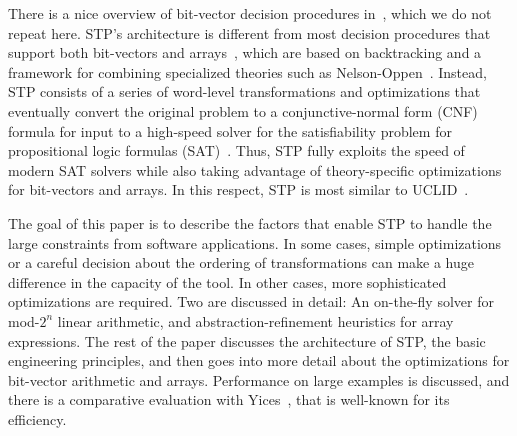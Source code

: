 There is a nice overview of bit-vector decision procedures
in~\cite{uclid07}, which we do not repeat here.  STP's architecture is
different from most decision procedures that support both bit-vectors
and arrays~\cite{cvc,cvcl,yices}, which are based on backtracking and
a framework for combining specialized theories such as
Nelson-Oppen~\cite{nelsonoppen}. Instead, STP consists of a series of
word-level transformations and optimizations that eventually convert
the original problem to a conjunctive-normal form (CNF) formula for
input to a high-speed solver for the satisfiability problem for
propositional logic formulas (SAT)~\cite{minisat}.  Thus, STP fully
exploits the speed of modern SAT solvers while also taking advantage
of theory-specific optimizations for bit-vectors and arrays.  In this
respect, STP is most similar to UCLID~\cite{uclid}.

The goal of this paper is to describe the factors that enable STP to
handle the large constraints from software applications.  In some
cases, simple optimizations or a careful decision about the ordering
of transformations can make a huge difference in the capacity of the
tool.  In other cases, more sophisticated optimizations are required.
Two are discussed in detail: An on-the-fly solver for mod-$2^n$ linear
arithmetic, and abstraction-refinement heuristics for array
expressions. The rest of the paper discusses the architecture of STP,
the basic engineering principles, and then goes into more detail about
the optimizations for bit-vector arithmetic and arrays. Performance on
large examples is discussed, and there is a comparative evaluation
with Yices~\cite{yices}, that is well-known for its efficiency.
